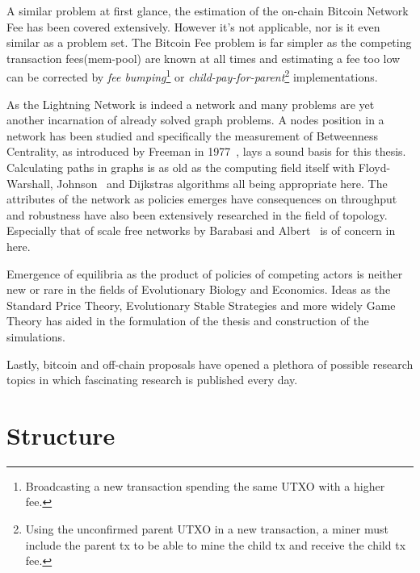 	A similar problem at first glance, the estimation of the on-chain Bitcoin Network Fee has been covered extensively. However it's not applicable, nor is it even similar as a problem set. The Bitcoin Fee problem is far simpler as the competing transaction fees(mem-pool) are known at all times and estimating a fee too low can be corrected by \textit{fee bumping}\footnote{Broadcasting a new transaction spending the same UTXO with a higher fee.} or \textit{child-pay-for-parent}\footnote{Using the unconfirmed parent UTXO in a new transaction, a miner must include the parent tx to be able to mine the child tx and receive the child tx fee.} implementations.
	
	As the Lightning Network is indeed a network and many problems are yet another incarnation of already solved graph problems. A nodes position in a network has been studied and specifically the measurement of Betweenness Centrality, as introduced by Freeman in 1977~\cite{brandes:betweenness:centrality:algorithm}, lays a sound basis for this thesis. Calculating paths in graphs is as old as the computing field itself with Floyd-Warshall, Johnson~\cite{johnson:shortest:path:sparse:network} and Dijkstras algorithms all being appropriate here. The attributes of the network as policies emerges have consequences on throughput and robustness have also been extensively researched in the field of topology. Especially that of scale free networks by Barabasi and Albert~\cite{barabasi:albert:emergent:scaling} is of concern in here.
	
	Emergence of equilibria as the product of policies of competing actors is neither new or rare in the fields of Evolutionary Biology and Economics. Ideas as the Standard Price Theory, Evolutionary Stable Strategies and more widely Game Theory has aided in the formulation of the thesis and construction of the simulations.
	
	Lastly, bitcoin and off-chain proposals have opened a plethora of possible research topics in which fascinating research is published every day.  
	
	
\section{Structure}

